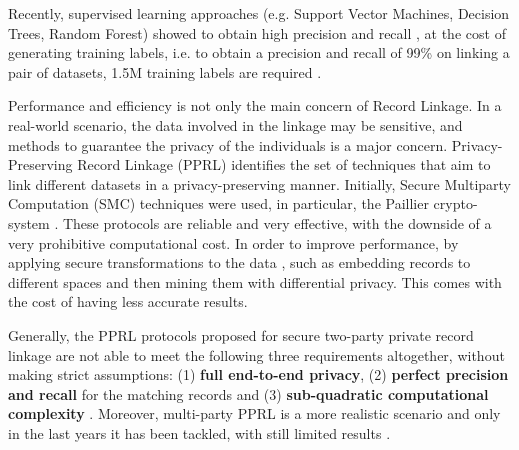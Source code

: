 \documentclass[12pt]{article}
\begin{document}
Recently, supervised learning approaches (e.g. Support Vector Machines, Decision Trees, Random Forest) showed to obtain high precision and recall \cite*{Das2017}, 
at the cost of generating training labels, i.e. to obtain a precision and recall of 99\% on linking a pair of datasets, 1.5M training labels are required \cite*{Dong2018}.

Performance and efficiency is not only the main concern of Record Linkage. In a real-world scenario, the data involved in the linkage may be sensitive, and methods to guarantee 
the privacy of the individuals is a major concern. Privacy-Preserving Record Linkage (PPRL) identifies the set of techniques that aim to link different datasets in 
a privacy-preserving manner.
Initially, Secure Multiparty Computation (SMC) techniques were used, in particular, the Paillier crypto-system \cite*{paillier1999public}. 
These protocols are reliable and very effective, with the downside of a very prohibitive computational cost. 
In order to improve performance, by applying secure transformations to the data \cite*{Bonomi2013}, such as embedding records to different spaces and then mining them with differential privacy.
This comes with the cost of having less accurate results. 

Generally, the PPRL protocols proposed for secure two-party private record linkage are not able to meet the following three requirements altogether, without making strict assumptions: 
(1) \textbf{full end-to-end privacy}, 
(2) \textbf{perfect precision and recall} for the matching records and (3) \textbf{sub-quadratic computational complexity} \cite*{He2017, Groce2019}. 
Moreover, multi-party PPRL is a more realistic scenario and only in the last years it has been tackled, with still limited results \cite*{Vatsalan2016, Vatsalan2017, Vatsalan2020}.
\end{document}
